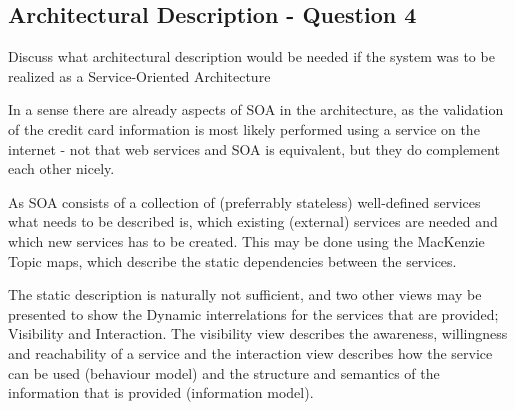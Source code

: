 \subsection{Architectural Description - Question 4}
\label{sec:ad_q4}
\begin{question}
Discuss what architectural description would be needed if
the system was to be realized as a Service-Oriented Architecture
\end{question}

In a sense there are already aspects of SOA in the architecture, as the validation of the credit card information is most likely performed using a service on the internet - not that web services and SOA is equivalent, but they do complement each other nicely.

As SOA consists of a collection of (preferrably stateless) well-defined services what needs to be described is, which existing (external) services are needed and which new services has to be created. This may be done using the MacKenzie Topic maps, which describe the static dependencies between the services.

The static description is naturally not sufficient, and two other views may be presented to show the Dynamic interrelations for the services that are provided; Visibility and Interaction. The visibility view describes the awareness, willingness and reachability of a service and the interaction view describes how the service can be used (behaviour model) and the structure and semantics of the information that is provided (information model).

